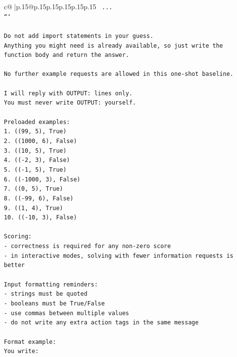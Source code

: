 \documentclass{article}
\begin{document}
{\begin{supertabular}{c@{$\;$}|p{.15\linewidth}@{}p{.15\linewidth}p{.15\linewidth}p{.15\linewidth}p{.15\linewidth}p{.15\linewidth}}
{{{\texttt{    ...} \\
\texttt{```} \\
\\ 
\texttt{Do not add import statements in your guess.} \\
\texttt{Anything you might need is already available, so just write the function body and return the answer.} \\
\\ 
\texttt{No further example requests are allowed in this one{-}shot baseline.} \\
\\ 
\texttt{I will reply with OUTPUT: lines only.} \\
\texttt{You must never write OUTPUT: yourself.} \\
\\ 
\texttt{Preloaded examples:} \\
\texttt{1. ((99, 5), True)} \\
\texttt{2. ((1000, 6), False)} \\
\texttt{3. ((10, 5), True)} \\
\texttt{4. (({-}2, 3), False)} \\
\texttt{5. (({-}1, 5), True)} \\
\texttt{6. (({-}1000, 3), False)} \\
\texttt{7. ((0, 5), True)} \\
\texttt{8. (({-}99, 6), False)} \\
\texttt{9. ((1, 4), True)} \\
\texttt{10. (({-}10, 3), False)} \\
\\ 
\texttt{Scoring:} \\
\texttt{{-} correctness is required for any non{-}zero score} \\
\texttt{{-} in interactive modes, solving with fewer information requests is better} \\
\\ 
\texttt{Input formatting reminders:} \\
\texttt{{-} strings must be quoted} \\
\texttt{{-} booleans must be True/False} \\
\texttt{{-} use commas between multiple values} \\
\texttt{{-} do not write any extra action tags in the same message} \\
\\ 
\texttt{Format example:} \\
\texttt{You write:} \\
}}}
\end{supertabular}}
\end{document}
